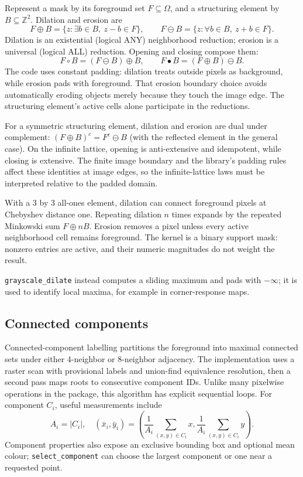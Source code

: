 \documentclass[11pt,a4paper]{article}
\newcommand{\Z}{\mathbb{Z}}
\newcommand{\1}{\mathbf{1}}
\begin{document}
Represent a mask by its foreground set $F\subseteq\Omega$, and a structuring
element by $B\subseteq\Z^2$. Dilation and erosion are
\[
 F\oplus B=\{z:\exists b\in B,\ z-b\in F\},\qquad
 F\ominus B=\{z:\forall b\in B,\ z+b\in F\}.
\]
Dilation is an existential (logical ANY) neighborhood reduction; erosion is a
universal (logical ALL) reduction. Opening and closing compose them:
\[
  F\circ B=(F\ominus B)\oplus B,\qquad
  F\bullet B=(F\oplus B)\ominus B.
\]
The code uses constant padding: dilation treats outside pixels as background,
while erosion pads with foreground. That erosion boundary choice avoids
automatically eroding objects merely because they touch the image edge. The
structuring element's active cells alone participate in the reductions.

For a symmetric structuring element, dilation and erosion are dual under
complement: $(F\oplus B)^c=F^c\ominus B$ (with the reflected element in the
general case). On the infinite lattice, opening is anti-extensive and
idempotent, while closing is extensive. The finite image boundary and the
library's padding rules affect these identities at image edges, so the
infinite-lattice laws must be interpreted relative to the padded domain.

With a 3 by 3 all-ones element, dilation can connect foreground pixels at
Chebyshev distance one. Repeating dilation $n$ times expands by the repeated
Minkowski sum $F\oplus nB$. Erosion removes a pixel unless every active
neighborhood cell remains foreground. The kernel is a binary support mask:
nonzero entries are active, and their numeric magnitudes do not weight the
result.

\texttt{grayscale\_dilate} instead computes a sliding maximum and pads with $-\infty$;
it is used to identify local maxima, for example in corner-response maps.

\subsection{Connected components}

Connected-component labelling partitions the foreground into maximal connected
sets under either 4-neighbor or 8-neighbor adjacency. The implementation uses
a raster scan with provisional labels and union-find equivalence resolution,
then a second pass maps roots to consecutive component IDs. Unlike many
pixelwise operations in the package, this algorithm has explicit sequential
loops. For component $C_i$, useful measurements include
\[
 A_i=|C_i|,\quad
 (\bar{x}_i,\bar{y}_i)=\left(\frac{1}{A_i}\sum_{(x,y)\in C_i}x,
                            \frac{1}{A_i}\sum_{(x,y)\in C_i}y\right).
\]
Component properties also expose an exclusive bounding box and optional mean
colour; \texttt{select\_component} can choose the largest component or one near a
requested point.
\end{document}
